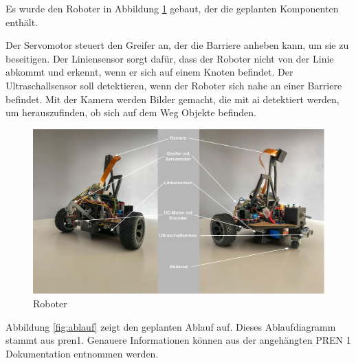 Es wurde den Roboter in Abbildung \ref{fig:robo-labeled} gebaut, der die geplanten Komponenten enthält.

Der Servomotor steuert den Greifer an, der die Barriere anheben kann, um sie zu beseitigen. Der Liniensensor sorgt dafür, dass der Roboter nicht von der Linie abkommt und erkennt, wenn er sich auf einem Knoten befindet. Der Ultraschallsensor soll detektieren, wenn der Roboter sich nahe an einer Barriere befindet. Mit der Kamera werden Bilder gemacht, die mit \acrfull{ai} detektiert werden, um herauszufinden, ob sich auf dem Weg Objekte befinden.

\begin{figure}[H]
\centering
\includegraphics[width=\textwidth]{assets/robo-labeled.jpg}
\caption{Roboter}
\label{fig:robo-labeled}
\end{figure}

\newpage
Abbildung \ref{fig:ablauf} zeigt den geplanten Ablauf auf. Dieses Ablaufdiagramm stammt aus \acrshort{pren1}. Genauere Informationen können aus der angehängten PREN 1 Dokumentation entnommen werden.

